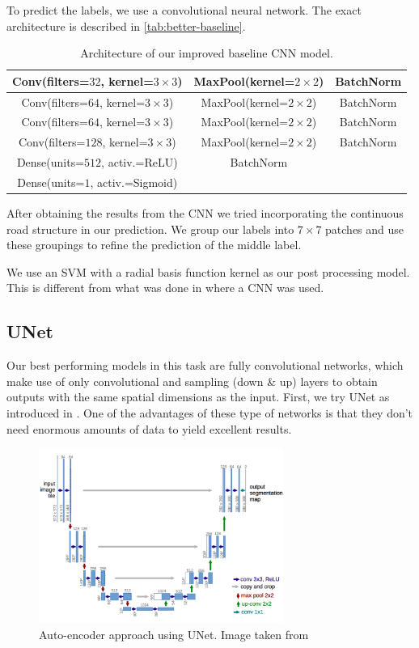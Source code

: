 To predict the labels, we use a convolutional neural network. The exact architecture is described in \autoref{tab:better-baseline}.

\begin{table}[h]
    \centering
    \begin{tabular}{|c|c|c|}
        \hline
        Conv(filters=$32$, kernel=$3 \times 3$) & MaxPool(kernel=$2 \times 2$) & BatchNorm \\
        \hline
        \hline
        Conv(filters=$64$, kernel=$3 \times 3$) & MaxPool(kernel=$2 \times 2$) & BatchNorm \\
        \hline
        \hline
        Conv(filters=$64$, kernel=$3 \times 3$) & MaxPool(kernel=$2 \times 2$) & BatchNorm \\
        \hline
        \hline
        Conv(filters=$128$, kernel=$3 \times 3$) & MaxPool(kernel=$2 \times 2$) &BatchNorm \\
        \hline
        \hline
        Dense(units=$512$, activ.=ReLU) & BatchNorm &  \\
        \hline
        \hline
        Dense(units=$1$, activ.=Sigmoid) & & \\
        \hline
    \end{tabular}
    \caption{Architecture of our improved baseline CNN model.}
    \label{tab:better-baseline}
\end{table}

After obtaining the results from the CNN we tried incorporating the continuous road structure in our prediction. We group our labels into $7 \times 7$ patches and use these groupings to refine the prediction of the middle label.

We use an SVM with a radial basis function kernel as our post processing model. This is different from what was done in \cite{He15} where a CNN was used.

\subsection{UNet} \label{subsec:UNet}
Our best performing models in this task are fully convolutional networks, which make use of only convolutional and sampling (down \& up) layers to obtain outputs with the same spatial dimensions as the input. First, we try UNet as introduced in \cite{Ron15}. One of the advantages of these type of networks is that they don't need enormous amounts of data to yield excellent results.

\begin{figure}[h]
\includegraphics[width=8cm]{images/unet.png}
\caption{Auto-encoder approach using UNet. Image taken from \cite{Ron15}}
\end{figure}

